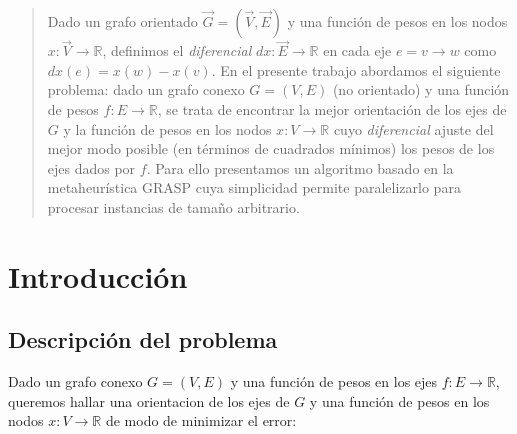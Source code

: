 \documentclass[conference,compsoc,a4paper]{IEEEtran}
\begin{document}




\maketitle

\begin{abstract}
Dado un grafo orientado $\vec G=(\vec V,\vec E)$ y una función de pesos 
en los nodos $x: \vec V \rightarrow \mathbb{R}$, definimos el 
\textit{diferencial} $dx: \vec E \rightarrow \mathbb{R}$ en cada eje $e=v\to 
w$ como $dx(e) = x(w) - x(v)$. En el presente trabajo abordamos el 
siguiente problema: dado un grafo conexo $G=(V,E)$  (no orientado) y 
una función de pesos $f: E \rightarrow \mathbb{R}$, se 
trata de encontrar la mejor orientación de los ejes de $G$ y la función 
de pesos en los nodos $x: V \rightarrow \mathbb{R}$ cuyo 
\textit{diferencial} ajuste del mejor modo posible (en términos de 
cuadrados mínimos) los pesos de los ejes dados por $f$. Para ello 
presentamos un algoritmo basado en la metaheurística GRASP cuya 
simplicidad permite paralelizarlo para procesar instancias de tamaño 
arbitrario.
\end{abstract}





%
\IEEEpeerreviewmaketitle



\section{Introducción}
\subsection{Descripción del problema}

Dado un grafo conexo $G=(V,E)$ \cite{Harari:1969} y una función 
de pesos en los ejes $f: E \rightarrow \mathbb{R}$, queremos hallar 
una orientacion de los ejes de $G$ y una función de pesos en los 
nodos $x: V \rightarrow \mathbb{R}$ de modo 
de minimizar el error:
\end{document}
